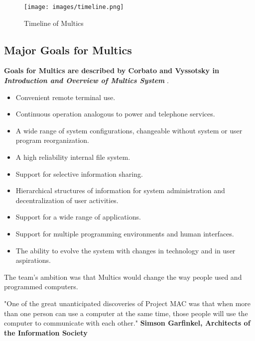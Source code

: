 \begin{figure}
    \texttt{[image: images/timeline.png]}
    \caption{Timeline of Multics \cite{multicians}}
\end{figure}


\subsection{Major Goals for Multics}
\textbf{Goals for Multics are described by Corbato and Vyssotsky in \textit{Introduction and Overview of Multics System}} \cite{introductionMultics}.
\begin{itemize}
    \item Convenient remote terminal use.
    \item Continuous operation analogous to power and telephone services.
    \item A wide range of system configurations, changeable without system or user program reorganization.
    \item A high reliability internal file system.
    \item Support for selective information sharing.
    \item Hierarchical structures of information for system administration and decentralization of user activities.
    \item Support for a wide range of applications.
    \item Support for multiple programming environments and human interfaces.
    \item The ability to evolve the system with changes in technology and in user aspirations.
\end{itemize}

The team's ambition was that Multics would change the way people used and programmed computers.
\newline
\begin{displayquote}
"One of the great unanticipated discoveries of Project MAC was that 
when more than one person can use a computer at the same time, those people will
use the computer to communicate with each other." 
\textbf{Simson Garfinkel, Architects of the Information Society}
\end{displayquote}
